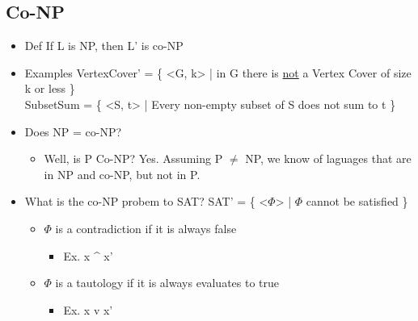 \documentclass[11pt]{article}
\begin{document}
\subsection{Co-NP}
\label{sec:org503b5d5}
\begin{itemize}
\item Def
If L is NP, then L' is co-NP
\item Examples
VertexCover' = \{ <G, k> | in G there is \uline{not} a Vertex Cover of size k or less \}\\
SubsetSum = \{ <S, t> | Every non-empty subset of S does not sum to t \}
\item Does NP = co-NP?
\begin{itemize}
\item Well, is P \subseteq Co-NP?
Yes. Assuming P \(\ne\) NP, we know of laguages that are in NP and co-NP, but not in P.
\end{itemize}
\item What is the co-NP probem to SAT?
SAT' = \{ <\(\Phi\)> | \(\Phi\) cannot be satisfied \}
\begin{itemize}
\item \(\Phi\) is a contradiction if it is always false
\begin{itemize}
\item Ex. x \^{} x'
\end{itemize}
\item \(\Phi\) is a tautology if it is always evaluates to true
\begin{itemize}
\item Ex. x v x'
\end{itemize}
\end{itemize}
\end{itemize}
\end{document}
